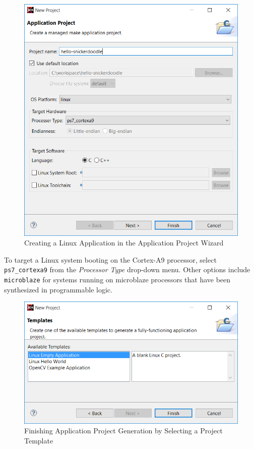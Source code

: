 \begin{figure}[h!]
	\centering
	\includegraphics{images/New_Linux_Project.png}
	\caption{Creating a Linux Application in the Application Project Wizard}
\end{figure}

\noindent
To target a Linux system booting on the Cortex-A9 processor, select \texttt{ps7\_cortexa9} from the \textit{Processor Type} drop-down menu. Other options include \texttt{microblaze} for systems running on microblaze processors that have been synthesized in programmable logic. \\


\begin{figure}[h!]
	\centering
	\includegraphics{images/Linux_Empty_Application.png}
	\caption{Finishing Application Project Generation by Selecting a Project Template}
\end{figure}

